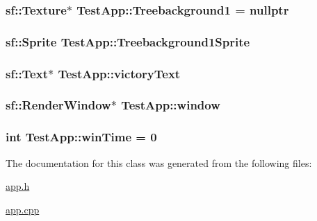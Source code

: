 \subsubsection[{\texorpdfstring{Treebackground1}{Treebackground1}}]{\setlength{\rightskip}{0pt plus 5cm}sf\+::\+Texture$\ast$ Test\+App\+::\+Treebackground1 = nullptr\hspace{0.3cm}{\ttfamily [protected]}}\hypertarget{classTestApp_a4695890302b958844789db4f9b168647}{}\label{classTestApp_a4695890302b958844789db4f9b168647}
\subsubsection[{\texorpdfstring{Treebackground1\+Sprite}{Treebackground1Sprite}}]{\setlength{\rightskip}{0pt plus 5cm}sf\+::\+Sprite Test\+App\+::\+Treebackground1\+Sprite\hspace{0.3cm}{\ttfamily [protected]}}\hypertarget{classTestApp_a3cc57075ee88b4efd811e9a0ebac1d04}{}\label{classTestApp_a3cc57075ee88b4efd811e9a0ebac1d04}
\subsubsection[{\texorpdfstring{victory\+Text}{victoryText}}]{\setlength{\rightskip}{0pt plus 5cm}sf\+::\+Text$\ast$ Test\+App\+::victory\+Text\hspace{0.3cm}{\ttfamily [protected]}}\hypertarget{classTestApp_a11b6f78ad8d0e5eaf77971cbf8cbe723}{}\label{classTestApp_a11b6f78ad8d0e5eaf77971cbf8cbe723}
\subsubsection[{\texorpdfstring{window}{window}}]{\setlength{\rightskip}{0pt plus 5cm}sf\+::\+Render\+Window$\ast$ Test\+App\+::window\hspace{0.3cm}{\ttfamily [protected]}}\hypertarget{classTestApp_a0b6b080a777092db64519ef7c4309105}{}\label{classTestApp_a0b6b080a777092db64519ef7c4309105}
\subsubsection[{\texorpdfstring{win\+Time}{winTime}}]{\setlength{\rightskip}{0pt plus 5cm}int Test\+App\+::win\+Time = 0\hspace{0.3cm}{\ttfamily [protected]}}\hypertarget{classTestApp_a87f8cb9a20615e4e0b08b583a7faaaf5}{}\label{classTestApp_a87f8cb9a20615e4e0b08b583a7faaaf5}


The documentation for this class was generated from the following files\+:\begin{DoxyCompactItemize}
\item 
\hyperlink{app_8h}{app.\+h}\item 
\hyperlink{app_8cpp}{app.\+cpp}\end{DoxyCompactItemize}
